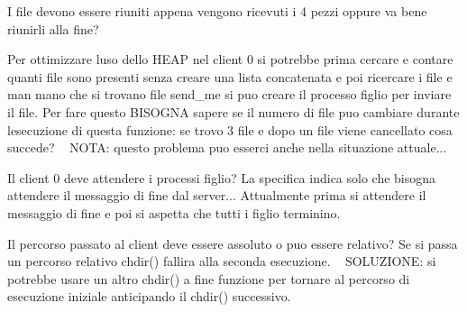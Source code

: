 
\begin{DoxyRefList}
\item[\label{warning__warning000004}%
\Hypertarget{warning__warning000004}%
Globale \hyperlink{server_8c_a0ddf1224851353fc92bfbff6f499fa97}{main} (int argc, char $\ast$argv\mbox{[}\mbox{]})]I file devono essere riuniti appena vengono ricevuti i 4 pezzi oppure va bene riunirli alla fine?  
\item[\label{warning__warning000001}%
\Hypertarget{warning__warning000001}%
Globale \hyperlink{client_8h_a8c7084a254c7cd640d66e647795ff8f6}{operazioni\+\_\+client0} ()]Per ottimizzare l\textquotesingle{}uso dello H\+E\+AP nel client 0 si potrebbe prima cercare e contare quanti file sono presenti senza creare una lista concatenata e poi ricercare i file e man mano che si trovano file send\+\_\+me si puo\textquotesingle{} creare il processo figlio per inviare il file. Per fare questo B\+I\+S\+O\+G\+NA sapere se il numero di file puo\textquotesingle{} cambiare durante l\textquotesingle{}esecuzione di questa funzione\+: se trovo 3 file e dopo un file viene cancellato cosa succede? ~\newline
 N\+O\+TA\+: questo problema puo\textquotesingle{} esserci anche nella situazione attuale...

Il client 0 deve attendere i processi figlio? La specifica indica solo che bisogna attendere il messaggio di fine dal server... Attualmente prima si attendere il messaggio di fine e poi si aspetta che tutti i figlio terminino.

Il percorso passato al client deve essere assoluto o puo\textquotesingle{} essere relativo? Se si passa un percorso relativo chdir() fallira\textquotesingle{} alla seconda esecuzione. ~\newline
 S\+O\+L\+U\+Z\+I\+O\+NE\+: si potrebbe usare un altro chdir() a fine funzione per tornare al percorso di esecuzione iniziale anticipando il chdir() successivo.
\end{DoxyRefList}